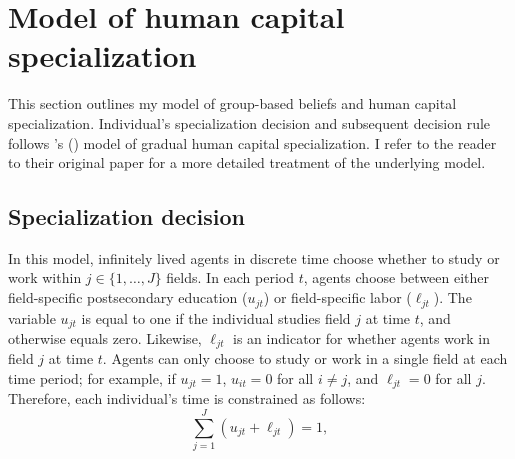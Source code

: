 \documentclass[10 pt]{article}
\newcommand{\toedit}[1]{{\color{gray}#1}}
\newcommand{\toedit}[1]{#1}
\newcommand{\citeposs}[1]{{\citeauthor{#1}'s (\citeyear{#1})}}
\newcommand{\pr}[1]{\left( #1 \right)}
\begin{document}
\section{Model of human capital specialization}

This section outlines my model of group-based beliefs and human capital specialization.
Individual's specialization decision and subsequent decision rule follows \citeposs{AF20} model of gradual human capital specialization. 
I refer to the reader to their original paper for a more detailed treatment of the underlying model. 

\subsection{Specialization decision}

In this model, infinitely lived agents in discrete time choose whether to study or work within $j\in \{1, \dots, J\}$ fields.
In each period $t$, agents choose between either field-specific postsecondary education ($u_{jt}$) or field-specific labor ($\ell_{jt}$).
The variable $u_{jt}$ is equal to one if the individual studies field $j$ at time $t$, and otherwise equals zero. 
Likewise, $\ell_{jt}$ is an indicator for whether agents work in field $j$ at time $t$. 
Agents can only choose to study or work in a single field at each time period; for example, if $u_{jt} = 1$, $u_{it} = 0$ for all $i \neq j$, and $\ell_{jt} = 0$ for all $j$. 
Therefore, each individual's time is constrained as follows: 
\begin{equation*}
    \sum_{j=1}^J \pr{u_{jt} + \ell_{jt}} = 1,
\end{equation*}
\end{document}
